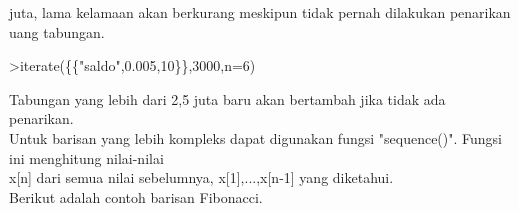\documentclass[a4paper,10pt]{article}
\begin{document}
\begin{eulernotebook}
\begin{eulercomment}
\begin{eulercomment}
\begin{eulercomment}
\begin{eulercomment}
\begin{eulercomment}
\begin{eulercomment}
\begin{eulercomment}
\begin{eulercomment}
\begin{eulercomment}
\begin{eulercomment}
\begin{eulercomment}
\begin{eulercomment}
\begin{eulercomment}
\begin{eulercomment}
\begin{eulercomment}
\begin{eulercomment}
\begin{eulercomment}
\begin{eulercomment}
\begin{eulercomment}
\begin{eulercomment}
\begin{eulercomment}
\begin{eulercomment}
\begin{eulercomment}
\begin{eulercomment}
\begin{eulercomment}
\begin{eulercomment}
\begin{eulercomment}
\begin{eulercomment}
\begin{eulercomment}
juta, lama kelamaan akan berkurang meskipun tidak pernah dilakukan
penarikan uang tabungan.
\end{eulercomment}
\begin{eulerprompt}
>iterate(\{\{"saldo",0.005,10\}\},3000,n=6)
\end{eulerprompt}
\begin{euleroutput}
  [3000,  3002,  3004.01,  3006.03,  3008.05,  3010.08,  3012.12]
\end{euleroutput}
\begin{eulercomment}
Tabungan yang lebih dari 2,5 juta baru akan bertambah jika tidak ada
penarikan.\\
Untuk barisan yang lebih kompleks dapat digunakan fungsi "sequence()".
Fungsi ini menghitung nilai-nilai\\
x[n] dari semua nilai sebelumnya, x[1],...,x[n-1] yang diketahui.\\
Berikut adalah contoh barisan Fibonacci.


\end{eulercomment}
\end{eulercomment}
\end{eulercomment}
\end{eulercomment}
\end{eulercomment}
\end{eulercomment}
\end{eulercomment}
\end{eulercomment}
\end{eulercomment}
\end{eulercomment}
\end{eulercomment}
\end{eulercomment}
\end{eulercomment}
\end{eulercomment}
\end{eulercomment}
\end{eulercomment}
\end{eulercomment}
\end{eulercomment}
\end{eulercomment}
\end{eulercomment}
\end{eulercomment}
\end{eulercomment}
\end{eulercomment}
\end{eulercomment}
\end{eulercomment}
\end{eulercomment}
\end{eulercomment}
\end{eulercomment}
\end{eulercomment}
\end{eulernotebook}
\end{document}

